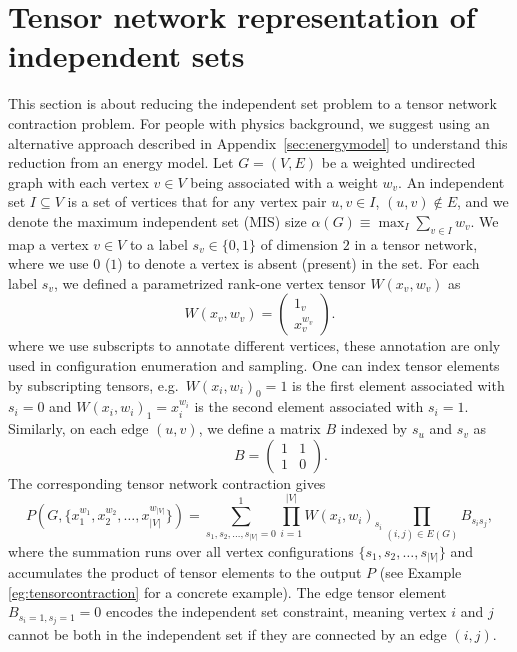\documentclass[onefignum, onetabnum]{siamart190516}
\newcommand{\<}{\langle}
\renewcommand{\>}{\rangle}
\newcommand{\App}[1]{Appendix~\ref{#1}}
\newcounter{example}
\begin{document}
\section{Tensor network representation of independent sets} \label{sec:tnmap}
This section is about reducing the independent set problem to a tensor network contraction problem.
For people with physics background, we suggest using an alternative approach described in \App{sec:energymodel} to understand this reduction from an energy model.
Let $G=(V,E)$ be a weighted undirected graph with each vertex $v\in V$ being associated with a weight $w_v$.
An independent set $I \subseteq V$ is a set of vertices that for any vertex pair $u,v \in I$, $(u, v) \not\in E$,
and we denote the maximum independent set (MIS) size $\alpha(G) \equiv \max_{I}\sum_{v\in I}w_v$. 
We map a vertex $v\in V$ to a label $s_v \in \{0, 1\}$ of dimension $2$ in a tensor network, where we use $0$ ($1$) to denote a vertex is absent (present) in the set.
For each label $s_v$, we defined a parametrized rank-one vertex tensor $W(x_v, w_v)$ as
\begin{equation}
    W(x_v, w_v) = \left(\begin{matrix}
        1_v \\
        x_v^{w_v}
    \end{matrix}\right).\label{eq:vertextensor}
\end{equation}
where we use subscripts to annotate different vertices, these annotation are only used in configuration enumeration and sampling.
One can index tensor elements by subscripting tensors, e.g.\ $W(x_i, w_i)_0=1$ is the first element associated with $s_i=0$ and $W(x_i, w_i)_1=x_i^{w_i}$ is the second element associated with $s_i=1$.
Similarly, on each edge $(u, v)$, we define a matrix $B$ indexed by $s_u$ and $s_v$ as
\begin{equation}
    \qquad \quad 
       B = \left(\begin{matrix}
        1  & 1\\
        1 & 0
    \end{matrix}\right). \label{eq:edgetensor}
\end{equation}
The corresponding tensor network contraction gives
\begin{equation}\label{eq:idp}
    P(G, \{x_1^{w_1}, x_{2}^{w_2}, \ldots,x_{|V|}^{w_{|V|}}\}) = \sum\limits_{s_1, s_2, \ldots, s_{|V|} = 0}^{1} \prod\limits_{i=1}^{|V|} W(x_i, w_i)_{s_i} \prod\limits_{(i,j) \in E(G)} B_{s_i s_j},
\end{equation}
where the summation runs over all vertex configurations $\{s_1, s_{2}, \ldots,s_{|V|}\}$ and accumulates the product of tensor elements to the output $P$ (see Example \ref{eg:tensorcontraction} for a concrete example).
The edge tensor element $B_{s_{i}=1, s_{j}=1} = 0$ encodes the independent set constraint, meaning vertex $i$ and $j$ cannot be both in the independent set if they are connected by an edge $(i,j)$.
\end{document}
